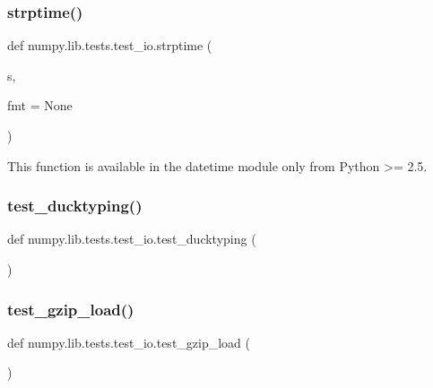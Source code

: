 \subsubsection{\texorpdfstring{strptime()}{strptime()}}
{\footnotesize\ttfamily def numpy.\+lib.\+tests.\+test\+\_\+io.\+strptime (\begin{DoxyParamCaption}\item[{}]{s,  }\item[{}]{fmt = {\ttfamily None} }\end{DoxyParamCaption})}

\begin{DoxyVerb}This function is available in the datetime module only from Python >=
2.5.\end{DoxyVerb}
 \mbox{\label{namespacenumpy_1_1lib_1_1tests_1_1test__io_ad1670ac4acfa93782b39fed1ace61b5b}} 
\subsubsection{\texorpdfstring{test\+\_\+ducktyping()}{test\_ducktyping()}}
{\footnotesize\ttfamily def numpy.\+lib.\+tests.\+test\+\_\+io.\+test\+\_\+ducktyping (\begin{DoxyParamCaption}{ }\end{DoxyParamCaption})}

\mbox{\label{namespacenumpy_1_1lib_1_1tests_1_1test__io_aeef1814be561297be81100de4b37cc42}} 
\subsubsection{\texorpdfstring{test\+\_\+gzip\+\_\+load()}{test\_gzip\_load()}}
{\footnotesize\ttfamily def numpy.\+lib.\+tests.\+test\+\_\+io.\+test\+\_\+gzip\+\_\+load (\begin{DoxyParamCaption}{ }\end{DoxyParamCaption})}

